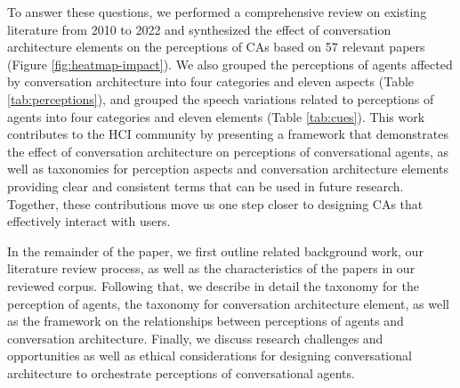 To answer these questions, we performed a comprehensive review on existing literature from 2010 to 2022 and synthesized the effect of conversation architecture elements on the perceptions of CAs based on 57 relevant papers (Figure \ref{fig:heatmap-impact}). We also grouped the perceptions of agents affected by conversation architecture into four categories and eleven aspects (Table \ref{tab:perceptions}), and grouped the speech variations related to perceptions of agents into four categories and eleven elements (Table \ref{tab:cues}). %
This work contributes to the HCI community by presenting a framework that demonstrates the effect of conversation architecture on perceptions of conversational agents, as well as taxonomies for perception aspects and conversation architecture elements providing clear and consistent terms that can be used in future research. Together, these contributions move us one step closer to designing CAs that effectively interact with users. 

In the remainder of the paper, we first outline related background work, our literature review process, as well as the characteristics of the papers in our reviewed corpus. Following that, we describe in detail the taxonomy for the perception of agents, the taxonomy for conversation architecture element, as well as the framework on the relationships between perceptions of agents and conversation architecture. Finally, we discuss research challenges and opportunities as well as ethical considerations for designing conversational architecture to orchestrate perceptions of conversational agents.
